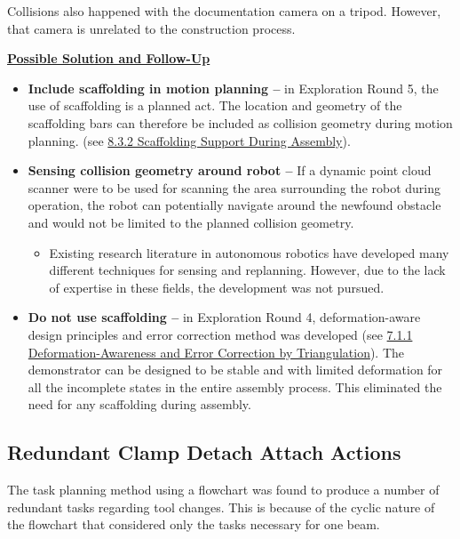 {


Collisions also happened with the documentation camera on a tripod. However, that camera is unrelated to the construction process.

\textbf{\ul{Possible Solution and Follow-Up}}

\begin{itemize}
	\item \textbf{Include scaffolding in motion planning --} in Exploration Round 5, the use of scaffolding is a planned act. The location and geometry of the scaffolding bars can therefore be included as collision geometry during motion planning. (see \ul{8.3.2 Scaffolding Support During Assembly}).

	\item \textbf{Sensing collision geometry around robot --} If a dynamic point cloud scanner were to be used for scanning the area surrounding the robot during operation, the robot can potentially navigate around the newfound obstacle and would not be limited to the planned collision geometry. 

\begin{itemize}
	\item Existing research literature in autonomous robotics have developed many different techniques for sensing and replanning. \parencite{elbanhawiSamplingBasedRobotMotion2014} However, due to the lack of expertise in these fields, the development was not pursued.

\end{itemize}
	\item \textbf{Do not use scaffolding --} in Exploration Round 4, deformation-aware design principles and error correction method was developed (see \ul{7.1.1 Deformation-Awareness and Error Correction by Triangulation}). The demonstrator can be designed to be stable and with limited deformation for all the incomplete states in the entire assembly process. This eliminated the need for any scaffolding during assembly. 

\end{itemize}

\subsection{Redundant Clamp Detach Attach Actions}
\label{subsection:exploration_3_redundant_clamp_detach_attach_actions}

The task planning method using a flowchart was found to produce a number of redundant tasks regarding tool changes. This is because of the cyclic nature of the flowchart that considered only the tasks necessary for one beam. 

}
